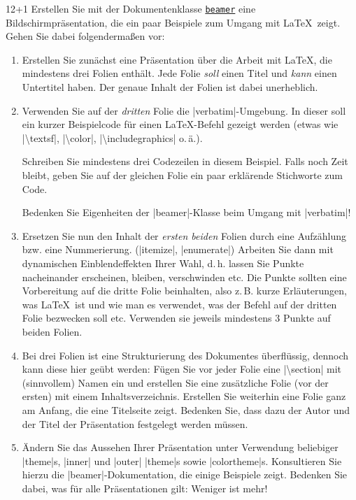 \documentclass{scrartcl}
\newcommand{\pkg}[1]{\href{http://ctan.org/pkg/#1}{\texttt{#1}}}
\begin{document}
\begin{question}[subtitle=Präsentation mit beamer]{12+1}
	Erstellen Sie mit der Dokumentenklasse \pkg{beamer} eine Bildschirmpräsentation, die ein paar Beispiele zum Umgang mit \LaTeX\ zeigt. Gehen Sie dabei folgendermaßen vor:
\begin{enumerate}[label=\alph*)]
	\item Erstellen Sie zunächst eine Präsentation über die Arbeit mit \LaTeX, die mindestens drei Folien enthält. Jede Folie \emph{soll} einen Titel und \emph{kann} einen Untertitel haben. Der genaue Inhalt der Folien ist dabei unerheblich.
	\item Verwenden Sie auf der \emph{dritten} Folie die |verbatim|-Umgebung. In dieser soll ein kurzer Beispielcode für einen \LaTeX-Befehl gezeigt werden (etwas wie |\textbackslash textsf|, |\textbackslash color|, |\textbackslash includegraphics| o.\,ä.).
	
	Schreiben Sie mindestens drei Codezeilen in diesem Beispiel. Falls noch Zeit bleibt, geben Sie auf der gleichen Folie ein paar erklärende Stichworte zum Code.

Bedenken Sie Eigenheiten der |beamer|-Klasse beim Umgang mit |verbatim|!
	\item Ersetzen Sie nun den Inhalt der \emph{ersten beiden} Folien durch eine Aufzählung bzw. eine Nummerierung. (|itemize|, |enumerate|) Arbeiten Sie dann mit dynamischen Einblendeffekten Ihrer Wahl, d.\,h. lassen Sie Punkte nacheinander erscheinen, bleiben, verschwinden etc. Die Punkte sollten eine Vorbereitung auf die dritte Folie beinhalten, also z.\,B. kurze Erläuterungen, was \LaTeX\ ist und wie man es verwendet, was der Befehl auf der dritten Folie bezwecken soll etc. Verwenden sie jeweils mindestens 3 Punkte auf beiden Folien.
	\item Bei drei Folien ist eine Strukturierung des Dokumentes überflüssig, dennoch kann diese hier geübt werden: Fügen Sie vor jeder Folie eine |\textbackslash section| mit (sinnvollem) Namen ein und erstellen Sie eine zusätzliche Folie (vor der ersten) mit einem Inhaltsverzeichnis. Erstellen Sie weiterhin eine Folie ganz am Anfang, die eine Titelseite zeigt. Bedenken Sie, dass dazu der Autor und der Titel der Präsentation festgelegt werden müssen.
	\item Ändern Sie das Aussehen Ihrer Präsentation unter Verwendung beliebiger |theme|s, |inner| und |outer| |theme|s sowie |colortheme|s. Konsultieren Sie hierzu die |beamer|-Dokumentation, die einige Beispiele zeigt. Bedenken Sie dabei, was für alle Präsentationen gilt: Weniger ist mehr! 


\end{enumerate}
\end{question}
\end{document}

